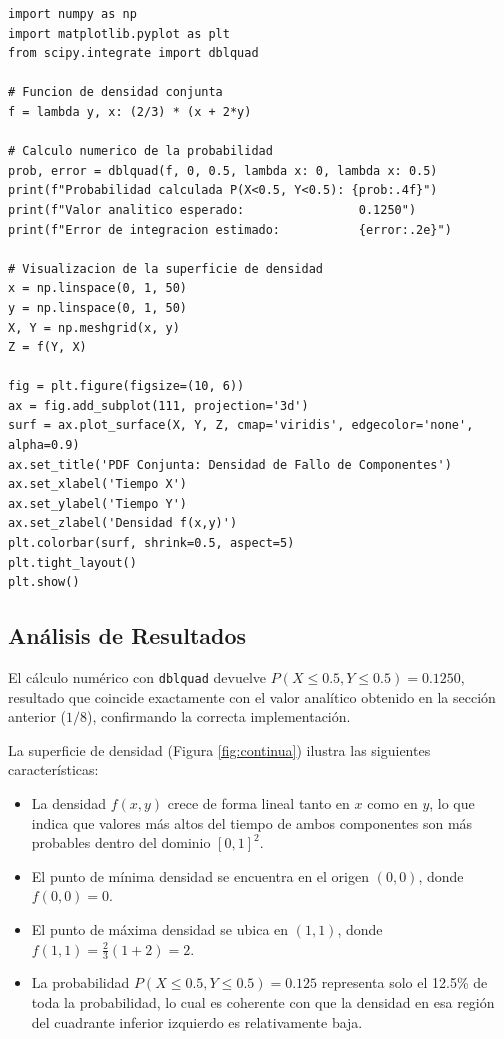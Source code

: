 \documentclass[12pt,a4paper]{article}
\begin{document}
\begin{lstlisting}
import numpy as np
import matplotlib.pyplot as plt
from scipy.integrate import dblquad
 
# Funcion de densidad conjunta
f = lambda y, x: (2/3) * (x + 2*y)
 
# Calculo numerico de la probabilidad
prob, error = dblquad(f, 0, 0.5, lambda x: 0, lambda x: 0.5)
print(f"Probabilidad calculada P(X<0.5, Y<0.5): {prob:.4f}")
print(f"Valor analitico esperado:                0.1250")
print(f"Error de integracion estimado:           {error:.2e}")
 
# Visualizacion de la superficie de densidad
x = np.linspace(0, 1, 50)
y = np.linspace(0, 1, 50)
X, Y = np.meshgrid(x, y)
Z = f(Y, X)
 
fig = plt.figure(figsize=(10, 6))
ax = fig.add_subplot(111, projection='3d')
surf = ax.plot_surface(X, Y, Z, cmap='viridis', edgecolor='none', alpha=0.9)
ax.set_title('PDF Conjunta: Densidad de Fallo de Componentes')
ax.set_xlabel('Tiempo X')
ax.set_ylabel('Tiempo Y')
ax.set_zlabel('Densidad f(x,y)')
plt.colorbar(surf, shrink=0.5, aspect=5)
plt.tight_layout()
plt.show()
\end{lstlisting}
 
\subsection{Análisis de Resultados}
 
El cálculo numérico con \texttt{dblquad} devuelve $P(X \leq 0.5, Y \leq 0.5) = 0.1250$, resultado que coincide exactamente con el valor analítico obtenido en la sección anterior ($1/8$), confirmando la correcta implementación.
 
La superficie de densidad (Figura \ref{fig:continua}) ilustra las siguientes características:
 
\begin{itemize}
    \item La densidad $f(x,y)$ crece de forma lineal tanto en $x$ como en $y$, lo que indica que valores más altos del tiempo de ambos componentes son más probables dentro del dominio $[0,1]^2$.
    \item El punto de mínima densidad se encuentra en el origen $(0, 0)$, donde $f(0,0) = 0$.
    \item El punto de máxima densidad se ubica en $(1, 1)$, donde $f(1,1) = \frac{2}{3}(1 + 2) = 2$.
    \item La probabilidad $P(X \leq 0.5, Y \leq 0.5) = 0.125$ representa solo el 12.5\% de toda la probabilidad, lo cual es coherente con que la densidad en esa región del cuadrante inferior izquierdo es relativamente baja.
\end{itemize}
 
\end{document}
